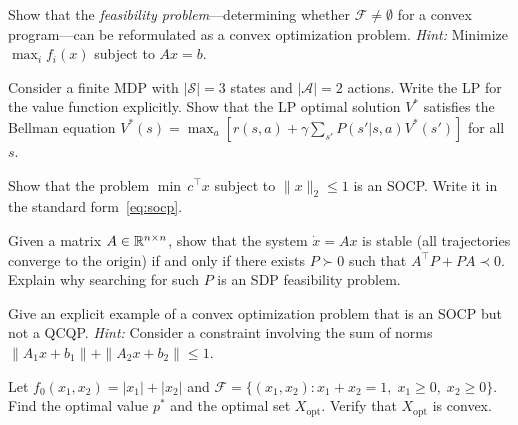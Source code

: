 \documentclass[11pt,a4paper]{article}
\begin{document}
\begin{exercise}\label{ex:feasibility}
Show that the \emph{feasibility problem}---determining whether
$\mathcal{F} \neq \emptyset$ for a convex program---can be reformulated as
a convex optimization problem.
\emph{Hint:} Minimize $\max_i f_i(x)$ subject to $Ax = b$.
\end{exercise}

\begin{exercise}\label{ex:lp-tight}
Consider a finite MDP with $|\mathcal{S}| = 3$ states and
$|\mathcal{A}| = 2$ actions. Write the LP for the value function
explicitly. Show that the LP optimal solution $V^*$ satisfies the Bellman
equation $V^*(s) = \max_a [r(s,a) + \gamma \sum_{s'} P(s'|s,a) V^*(s')]$
for all $s$.
\end{exercise}

\begin{exercise}\label{ex:socp-norm}
Show that the problem $\min\, c^\top x$ subject to $\|x\|_2 \le 1$ is an
SOCP. Write it in the standard form~\eqref{eq:socp}.
\end{exercise}

\begin{exercise}\label{ex:lyapunov}
Given a matrix $A \in \mathbb{R}^{n \times n}$, show that the system
$\dot{x} = Ax$ is stable (all trajectories converge to the origin) if and
only if there exists $P \succ 0$ such that $A^\top P + PA \prec 0$. Explain
why searching for such $P$ is an SDP feasibility problem.
\end{exercise}

\begin{exercise}\label{ex:hierarchy}
Give an explicit example of a convex optimization problem that is an SOCP but
not a QCQP. \emph{Hint:} Consider a constraint involving the sum of norms
$\|A_1 x + b_1\| + \|A_2 x + b_2\| \le 1$.
\end{exercise}

\begin{exercise}\label{ex:opt-set}
Let $f_0(x_1, x_2) = |x_1| + |x_2|$ and $\mathcal{F} = \{(x_1, x_2) :
x_1 + x_2 = 1, \; x_1 \ge 0, \; x_2 \ge 0\}$. Find the optimal value
$p^*$ and the optimal set $X_{\text{opt}}$. Verify that $X_{\text{opt}}$ is
convex.
\end{exercise}


\end{document}

